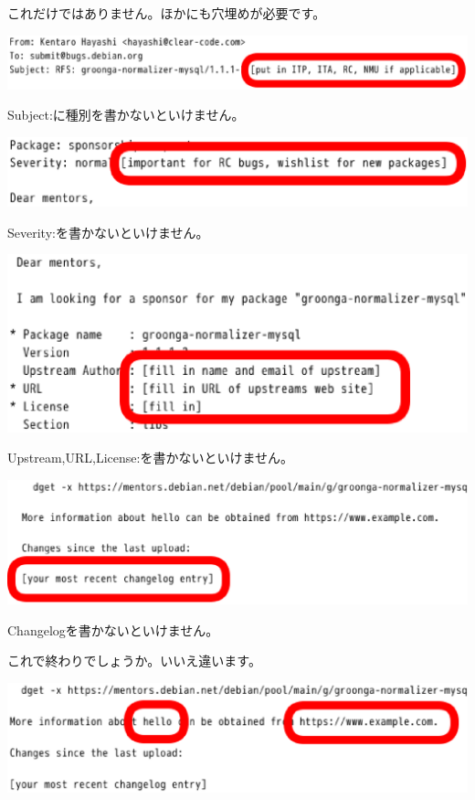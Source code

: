 \documentclass[mingoth,a4paper]{jsarticle}
\begin{document}
これだけではありません。ほかにも穴埋めが必要です。

\begin{screen}
\includegraphics[width=0.5\hsize]{image201606/rfs-template-fill-in1.eps}
\end{screen}

Subject:に種別を書かないといけません。

\begin{screen}
\includegraphics[width=0.5\hsize]{image201606/rfs-template-fill-in2.eps}
\end{screen}

Severity:を書かないといけません。

\begin{screen}
\includegraphics[width=0.5\hsize]{image201606/rfs-template-fill-in3.eps}
\end{screen}

Upstream,URL,License:を書かないといけません。

\begin{screen}
\includegraphics[width=0.5\hsize]{image201606/rfs-template-fill-in4.eps}
\end{screen}

Changelogを書かないといけません。

これで終わりでしょうか。いいえ違います。

\begin{screen}
\includegraphics[width=0.5\hsize]{image201606/rfs-template-fill-in5.eps}
\end{screen}
\end{document}
